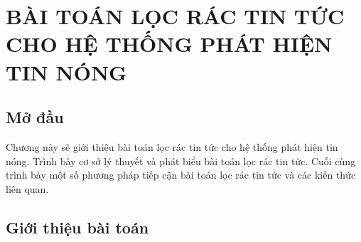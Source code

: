 \chapter{BÀI TOÁN LỌC RÁC TIN TỨC CHO HỆ THỐNG PHÁT HIỆN TIN NÓNG}
\ifpdf
    \graphicspath{{Chapter2/Chapter2Figs/PNG/}{Chapter2/Chapter2Figs/PDF/}{Chapter2/Chapter2Figs/}}
\else
    \graphicspath{{Chapter2/Chapter2Figs/EPS/}{Chapter2/Chapter2Figs/}}
\fi

\section{Mở đầu}
Chương này sẽ giới thiệu bài toán lọc rác tin tức cho hệ thống phát hiện tin nóng. Trình bày cơ sở lý thuyết và phát biểu bài toán lọc rác tin tức. Cuối cùng trình bày một số phương pháp tiếp cận bài toán lọc rác tin tức  và các kiến thức liên quan.
\section{Giới thiệu bài toán} %

